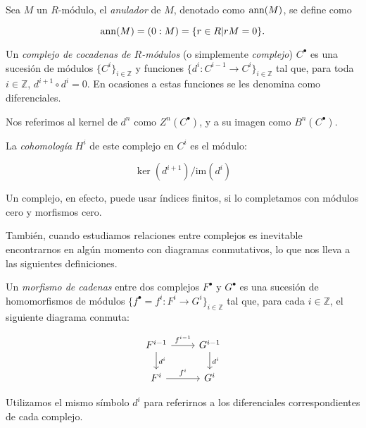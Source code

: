 \begin{definition}
Sea $M$ un $R$-módulo, el \emph{anulador} de $M$, denotado como $\textrm{ann}(M)$, se define como

$$ \textrm{ann}(M) = (0:M) = \{r \in R | rM = 0\}. $$

\end{definition}


\begin{definition}

Un \emph{complejo de cocadenas de $R$-módulos} (o simplemente \emph{complejo}) $C^{\bullet}$ es una sucesión de módulos $\{C^i\}_{i \in \mathbb{Z}}$ y funciones $\{d^i: C^{i-1}\rightarrow C^i\}_{i \in \mathbb{Z}}$ tal que, para toda $i \in \mathbb{Z}$, $d^{i+1} \circ d^i = 0$. En ocasiones a estas funciones se les denomina como diferenciales.

Nos referimos al kernel de $d^n$ como $Z^n(C^\bullet)$, y a su imagen como $B^n(C^\bullet)$.

La \emph{cohomología} $H^i$ de este complejo en $C^i$ es el módulo:

$$ \ker(d^{i+1})/\textrm{im}(d^{i})$$

\end{definition}

Un complejo, en efecto, puede usar índices finitos, si lo completamos con módulos cero y morfismos cero.

También, cuando estudiamos relaciones entre complejos es inevitable encontrarnos en algún momento con diagramas conmutativos, lo que nos lleva a las siguientes definiciones.

\begin{definition}

Un \emph{morfismo de cadenas} entre dos complejos $F^{\bullet}$ y $G^{\bullet}$ es una sucesión de homomorfismos de módulos $\{f^{\bullet} = {f^i:F^i \rightarrow G^i}\}_{i \in \mathbb{Z}}$ tal que, para cada $i \in \mathbb{Z}$, el siguiente diagrama conmuta:

\[
\begin{tikzcd}
F^{i-1} \arrow[d,"d^i"] \arrow[r,"f^{i-1}"] & G^{i-1} \arrow[d,"d^i"]\\
F^i \arrow[r,"f^i"] & G^i
\end{tikzcd}
\]

Utilizamos el mismo símbolo $d^i$ para referirnos a los diferenciales correspondientes de cada complejo.

\end{definition}

